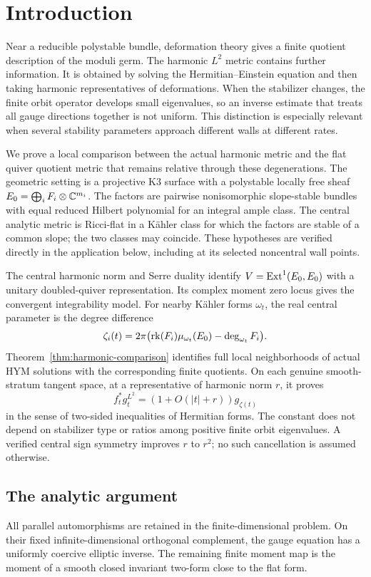 \section{Introduction}\label{sec:introduction}

Near a reducible polystable bundle, deformation theory gives a finite
quotient description of the moduli germ. The harmonic $L^2$ metric
contains further information. It is obtained by solving the
Hermitian--Einstein equation and then taking harmonic representatives
of deformations. When the stabilizer changes, the finite orbit
operator develops small eigenvalues, so an inverse estimate that
treats all gauge directions together is not uniform. This distinction
is especially relevant when several stability parameters approach
different walls at different rates.

We prove a local comparison between the actual harmonic metric and
the flat quiver quotient metric that remains relative through these
degenerations. The geometric setting is a projective K3 surface with
a polystable locally free sheaf
$E_0=\bigoplus_iF_i\otimes\mathbb C^{m_i}$.
The factors are pairwise nonisomorphic slope-stable bundles with
equal reduced Hilbert polynomial for an integral ample class.
The central analytic metric is Ricci-flat in a K\"ahler class for
which the factors are stable of a common slope; the two classes
may coincide. These hypotheses are verified directly in the
application below, including at its selected noncentral wall points.

The central harmonic norm and Serre duality identify
$V=\operatorname{Ext}^1(E_0,E_0)$ with a unitary doubled-quiver representation.
Its complex moment zero locus gives the convergent integrability
model. For nearby K\"ahler forms $\omega_t$, the real central
parameter is the degree difference
\[
 \zeta_i(t)=2\pi\bigl(\operatorname{rk}(F_i)\mu_{\omega_t}(E_0)
              -\deg_{\omega_t}F_i\bigr).
\]
Theorem~\ref{thm:harmonic-comparison} identifies full local
neighborhoods of actual HYM solutions with the corresponding
finite quotients. On each genuine smooth-stratum tangent space,
at a representative of harmonic norm $r$, it proves
\[
 f_t^*g_t^{L^2}=(1+O(|t|+r))g_{\zeta(t)}
\]
in the sense of two-sided inequalities of Hermitian forms.
The constant does not depend on stabilizer type or ratios among
positive finite orbit eigenvalues. A verified central sign symmetry
improves $r$ to $r^2$; no such cancellation is assumed otherwise.

\subsection{The analytic argument}
All parallel automorphisms are retained in the finite-dimensional
problem. On their fixed infinite-dimensional orthogonal complement,
the gauge equation has a uniformly coercive elliptic inverse.
The remaining finite moment map is the moment of a smooth closed
invariant two-form close to the flat form.

